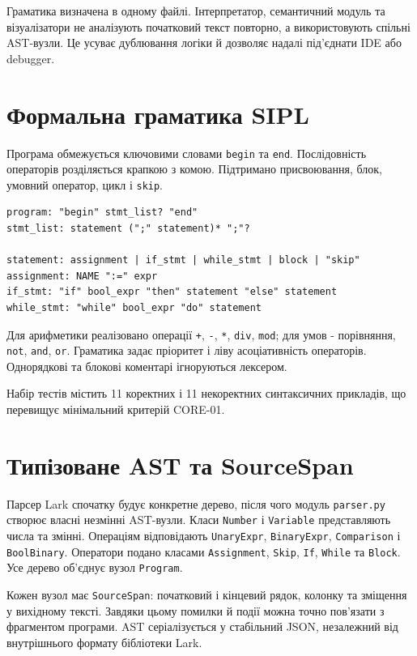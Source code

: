 \documentclass[12pt,a4paper]{article}
\newcommand{\code}[1]{\texttt{#1}}
\begin{document}
Граматика визначена в одному файлі. Інтерпретатор, семантичний модуль та
візуалізатори не аналізують початковий текст повторно, а використовують
спільні AST-вузли. Це усуває дублювання логіки й дозволяє надалі під'єднати
IDE або debugger.

\section{Формальна граматика SIPL}

Програма обмежується ключовими словами \code{begin} та \code{end}.
Послідовність операторів розділяється крапкою з комою. Підтримано
присвоювання, блок, умовний оператор, цикл і \code{skip}.

\begin{verbatim}
program: "begin" stmt_list? "end"
stmt_list: statement (";" statement)* ";"?

statement: assignment | if_stmt | while_stmt | block | "skip"
assignment: NAME ":=" expr
if_stmt: "if" bool_expr "then" statement "else" statement
while_stmt: "while" bool_expr "do" statement
\end{verbatim}

Для арифметики реалізовано операції \code{+}, \code{-}, \code{*},
\code{div}, \code{mod}; для умов - порівняння, \code{not},
\code{and}, \code{or}. Граматика задає пріоритет і ліву асоціативність
операторів. Однорядкові та блокові коментарі ігноруються лексером.

Набір тестів містить 11 коректних і 11 некоректних синтаксичних прикладів,
що перевищує мінімальний критерій CORE-01.

\section{Типізоване AST та SourceSpan}

Парсер Lark спочатку будує конкретне дерево, після чого модуль
\code{parser.py} створює власні незмінні AST-вузли. Класи \code{Number} і
\code{Variable} представляють числа та змінні. Операціям відповідають
\code{UnaryExpr}, \code{BinaryExpr}, \code{Comparison} і \code{BoolBinary}.
Оператори подано класами \code{Assignment}, \code{Skip}, \code{If},
\code{While} та \code{Block}. Усе дерево об'єднує вузол \code{Program}.

Кожен вузол має \code{SourceSpan}: початковий і кінцевий рядок, колонку та
зміщення у вихідному тексті. Завдяки цьому помилки й події можна точно
пов'язати з фрагментом програми. AST серіалізується у стабільний JSON,
незалежний від внутрішнього формату бібліотеки Lark.
\end{document}
